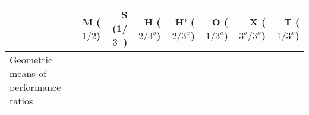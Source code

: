 \begin{tabular}{l*{7}{r}}\toprule
&M ($1/2$) &S (1/$3^-$)&H ($2/3^o$)&H' ($2/3^x$)&O ($1/3^o$)&X ($3^o/3^x$)&T ($1/3^x$)\\\midrule
Geometric means of performance ratios
}
\addlinespace
\bottomrule
\end{tabular}
